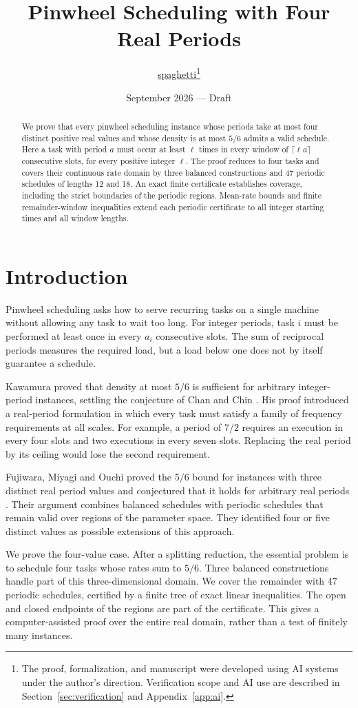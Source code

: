 \documentclass[11pt]{article}
\title{Pinwheel Scheduling with Four Real Periods}
\author{\href{https://x.com/spaghetti_codes}{spaghetti}\thanks{The proof, formalization, and manuscript were developed using AI systems under the author's direction. Verification scope and AI use are described in Section~\ref{sec:verification} and Appendix~\ref{app:ai}.}}
\date{September 2026 --- Draft}
\begin{document}
\maketitle
\begin{abstract}
We prove that every pinwheel scheduling instance whose periods take at most four distinct positive real values and whose density is at most $5/6$ admits a valid schedule. Here a task with period $a$ must occur at least $\ell$ times in every window of $\lceil\ell a\rceil$ consecutive slots, for every positive integer $\ell$. The proof reduces to four tasks and covers their continuous rate domain by three balanced constructions and 47 periodic schedules of lengths 12 and 18. An exact finite certificate establishes coverage, including the strict boundaries of the periodic regions. Mean-rate bounds and finite remainder-window inequalities extend each periodic certificate to all integer starting times and all window lengths.
\end{abstract}

\section*{Introduction}
Pinwheel scheduling asks how to serve recurring tasks on a single machine without allowing any task to wait too long. For integer periods, task $i$ must be performed at least once in every $a_i$ consecutive slots. The sum of reciprocal periods measures the required load, but a load below one does not by itself guarantee a schedule.

Kawamura proved that density at most $5/6$ is sufficient for arbitrary integer-period instances, settling the conjecture of Chan and Chin \cite{kawamura}. His proof introduced a real-period formulation in which every task must satisfy a family of frequency requirements at all scales. For example, a period of $7/2$ requires an execution in every four slots and two executions in every seven slots. Replacing the real period by its ceiling would lose the second requirement.

Fujiwara, Miyagi and Ouchi proved the $5/6$ bound for instances with three distinct real period values and conjectured that it holds for arbitrary real periods \cite{fmo}. Their argument combines balanced schedules with periodic schedules that remain valid over regions of the parameter space. They identified four or five distinct values as possible extensions of this approach.

We prove the four-value case. After a splitting reduction, the essential problem is to schedule four tasks whose rates sum to $5/6$. Three balanced constructions handle part of this three-dimensional domain. We cover the remainder with 47 periodic schedules, certified by a finite tree of exact linear inequalities. The open and closed endpoints of the regions are part of the certificate. This gives a computer-assisted proof over the entire real domain, rather than a test of finitely many instances.
\end{document}
